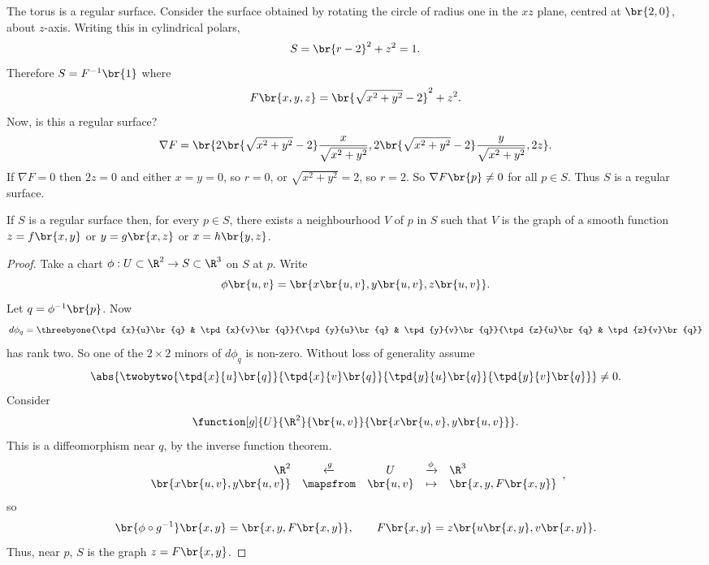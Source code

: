 \pagebreak

\begin{example*}
The torus is a regular surface. Consider the surface obtained by rotating the circle of radius one in the $ xz $ plane, centred at $ \br{2, 0} $, about $ z $-axis. Writing this in cylindrical polars,
$$ S = \br{r - 2}^2 + z^2 = 1. $$
Therefore $ S = F^{-1}\br{1} $ where
$$ F\br{x, y, z} = \br{\sqrt{x^2 + y^2} - 2}^2 + z^2. $$
Now, is this a regular surface?
$$ \nabla F = \br{2\br{\sqrt{x^2 + y^2} - 2}\dfrac{x}{\sqrt{x^2 + y^2}}, 2\br{\sqrt{x^2 + y^2} - 2}\dfrac{y}{\sqrt{x^2 + y^2}}, 2z}. $$
If $ \nabla F = 0 $ then $ 2z = 0 $ and either $ x = y = 0 $, so $ r = 0 $, or $ \sqrt{x^2 + y^2} = 2 $, so $ r = 2 $. So $ \nabla F\br{p} \ne 0 $ for all $ p \in S $. Thus $ S $ is a regular surface.
\end{example*}

\begin{proposition}
If $ S $ is a regular surface then, for every $ p \in S $, there exists a neighbourhood $ V $ of $ p $ in $ S $ such that $ V $ is the graph of a smooth function $ z = f\br{x, y} $ or $ y = g\br{x, z} $ or $ x = h\br{y, z} $.
\end{proposition}

\begin{proof}
Take a chart $ \phi : U \subset \R^2 \to S \subset \R^3 $ on $ S $ at $ p $. Write
$$ \phi\br{u, v} = \br{x\br{u, v}, y\br{u, v}, z\br{u, v}}. $$
Let $ q = \phi^{-1}\br{p} $. Now
$$ d\phi_q = \threebyone{\tpd{x}{u}\br{q} & \tpd{x}{v}\br{q}}{\tpd{y}{u}\br{q} & \tpd{y}{v}\br{q}}{\tpd{z}{u}\br{q} & \tpd{z}{v}\br{q}} $$
has rank two. So one of the $ 2 \times 2 $ minors of $ d\phi_q $ is non-zero. Without loss of generality assume
$$ \abs{\twobytwo{\tpd{x}{u}\br{q}}{\tpd{x}{v}\br{q}}{\tpd{y}{u}\br{q}}{\tpd{y}{v}\br{q}}} \ne 0. $$
Consider
$$ \function[g]{U}{\R^2}{\br{u, v}}{\br{x\br{u, v}, y\br{u, v}}}. $$
This is a diffeomorphism near $ q $, by the inverse function theorem.
$$
\begin{array}{rcccl}
\R^2 & \xleftarrow{g} & U & \xrightarrow{\phi} & \R^3 \\
\br{x\br{u, v}, y\br{u, v}} & \mapsfrom & \br{u, v} & \mapsto & \br{x, y, F\br{x, y}}
\end{array},
$$
so
$$ \br{\phi \circ g^{-1}}\br{x, y} = \br{x, y, F\br{x, y}}, \qquad F\br{x, y} = z\br{u\br{x, y}, v\br{x, y}}. $$
Thus, near $ p $, $ S $ is the graph $ z = F\br{x, y} $.
\end{proof}

\pagebreak


